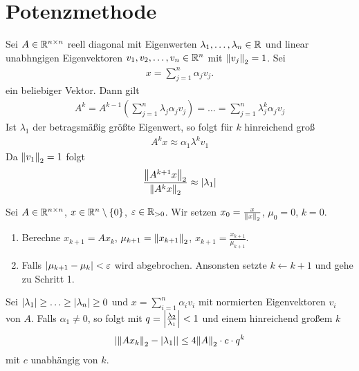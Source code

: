 \documentclass{report}
\begin{document}
	\section{Potenzmethode}
	\begin{proposition}
		Sei $A \in \mathbb{R}^{n \times n}$ reell diagonal mit Eigenwerten $\lambda_1, \hdots, \lambda_n \in \mathbb{R}$ und linear unabhngigen Eigenvektoren $v_1, v_2, \hdots, v_n \in \mathbb{R}^n$ mit $\norm{v_j}_2 = 1$. Sei
		\begin{align*}
			x = \sum_{j = 1}^n \alpha_j v_j.
		\end{align*}
		ein beliebiger Vektor.
		Dann gilt
		\begin{align*}
			A^k = A^{k-1}(\sum_{j = 1}^n \lambda_j \alpha_j v_j) = \hdots = \sum_{j = 1}^n \lambda_j^k \alpha_j v_j
		\end{align*}
		Ist $\lambda_1$ der betragsmäßig größte Eigenwert, so folgt für $k$ hinreichend groß
		\begin{align*}
			A^k x \approx \alpha_1 \lambda^k v_1
		\end{align*}
		Da $\norm{v_1}_2 = 1$ folgt
		\begin{align*}
			\frac{\norm{A^{k+1}x}_2}{\norm{A^kx}_2} \approx \abs{\lambda_1}
		\end{align*}
	\end{proposition}
	\begin{proposition}
		Sei $A \in \mathbb{R}^{n \times n}$, $x \in \mathbb{R}^n \setminus \qty{0}$, $\varepsilon \in \mathbb{R}_{>0}$. Wir setzen $x_0 = \frac{x}{\norm{x}_2}$, $\mu_0 = 0$, $k = 0$.
		\begin{enumerate}
			\item Berechne $x_{k+1} = Ax_k$, $\mu_{k+1} = \norm{x_{k+1}}_2$, $x_{k+1} = \frac{x_{k+1}}{\mu_{k+1}}$.
			\item Falls $\abs{\mu_{k+1} - \mu_k} < \varepsilon$ wird abgebrochen. Ansonsten setzte $k \gets k + 1$ und gehe zu Schritt 1.
		\end{enumerate} 
	\end{proposition}
	\begin{theorem}
		Sei $\abs{\lambda_1} \geq \hdots \geq \abs{\lambda_n} \geq 0$ und $x = \sum_{i = 1}^n \alpha_i v_i$ mit normierten Eigenvektoren $v_i$ von $A$.
		\newpar
		Falls $\alpha_1 \neq 0$, so folgt  mit $q = \abs{\frac{\lambda_2}{\lambda_1}} < 1$ und einem hinreichend großem $k$
		\begin{align*}
			\abs{\norm{Ax_k}_2 - \abs{\lambda_1}} \leq 4\norm{A}_2 \cdot c \cdot q^k
		\end{align*}
	mit $c$ unabhängig von $k$.
	\end{theorem}
\end{document}

